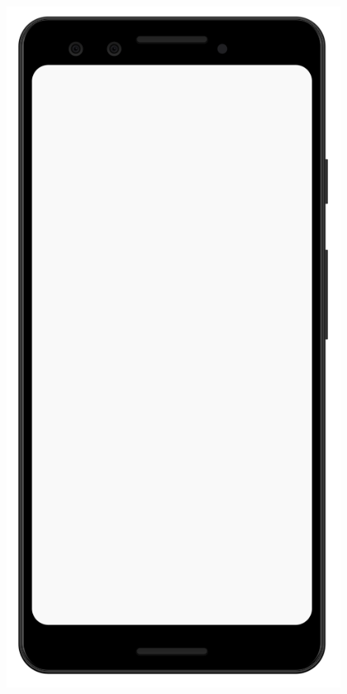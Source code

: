 \documentclass[12pt,a4paper,twoside,openright,titlepage]{book}
\begin{document}
\begin{figure}[H]
\centering
\includegraphics[scale = 0.2]{mobile}

\end{figure}
\end{document}
